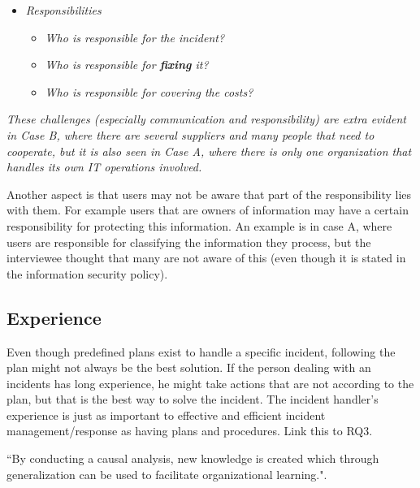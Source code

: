 \begin{itemize}
\item \textit{Responsibilities}
\begin{itemize}
\item \textit{Who is responsible for the incident?}
\item \textit{Who is responsible for \textbf{fixing} it?}
\item \textit{Who is responsible for covering the costs?}
\end{itemize}
\end{itemize}

\textit{These challenges (especially communication and responsibility) are extra evident in Case B, where there are several suppliers and many people that need to cooperate, but it is also seen in Case A, where there is only one organization that handles its own IT operations involved.}

Another aspect is that users may not be aware that part of the responsibility lies with them. For example users that are owners of information may have a certain responsibility for protecting this information. An example is in case A, where users are responsible for classifying the information they process, but the interviewee thought that many are not aware of this (even though it is stated in the information security policy).

\subsection{Experience}

Even though predefined plans exist to handle a specific incident, following the plan might not always be the best solution. If the person dealing with an incidents has long experience, he might take actions that are not according to the plan, but that is the best way to solve the incident. The incident handler's experience is just as important to effective and efficient incident management/response as having plans and procedures. Link this to RQ3.

``By conducting a causal analysis, new knowledge is created which through generalization can be used to facilitate organizational learning."\cite{werlinger2010preparation}.

